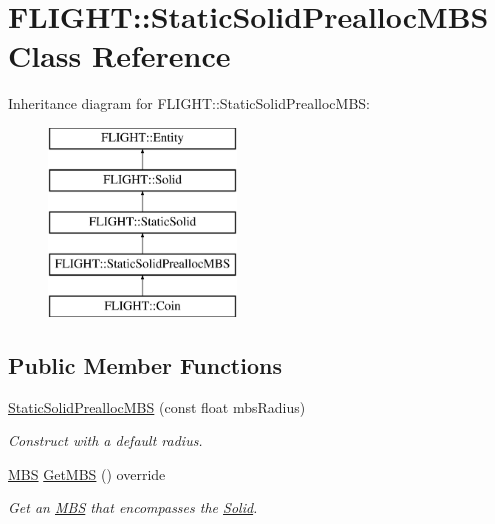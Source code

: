 \hypertarget{class_f_l_i_g_h_t_1_1_static_solid_prealloc_m_b_s}{}\section{F\+L\+I\+G\+HT\+:\+:Static\+Solid\+Prealloc\+M\+BS Class Reference}
\label{class_f_l_i_g_h_t_1_1_static_solid_prealloc_m_b_s}
Inheritance diagram for F\+L\+I\+G\+HT\+:\+:Static\+Solid\+Prealloc\+M\+BS\+:\begin{figure}[H]
\begin{center}
\leavevmode
\includegraphics[height=5.000000cm]{class_f_l_i_g_h_t_1_1_static_solid_prealloc_m_b_s}
\end{center}
\end{figure}
\subsection*{Public Member Functions}
\begin{DoxyCompactItemize}
\item 
\hyperlink{class_f_l_i_g_h_t_1_1_static_solid_prealloc_m_b_s_ad03a8b9c11e12370d3e21778803fed6e}{Static\+Solid\+Prealloc\+M\+BS} (const float mbs\+Radius)
\begin{DoxyCompactList}\small\item\em Construct with a default radius. \end{DoxyCompactList}\item 
\hyperlink{class_f_l_i_g_h_t_1_1_m_b_s}{M\+BS} \hyperlink{class_f_l_i_g_h_t_1_1_static_solid_prealloc_m_b_s_a3598b87e0be4695f62f526d74e99dc33}{Get\+M\+BS} () override
\begin{DoxyCompactList}\small\item\em Get an \hyperlink{class_f_l_i_g_h_t_1_1_m_b_s}{M\+BS} that encompasses the \hyperlink{class_f_l_i_g_h_t_1_1_solid}{Solid}. \end{DoxyCompactList}\end{DoxyCompactItemize}


